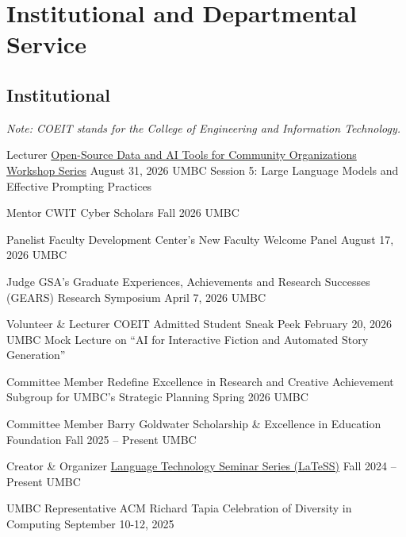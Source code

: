 \section*{{} Institutional and Departmental Service}
\subsection*{Institutional}
\textit{Note: COEIT stands for the College of Engineering and Information Technology.}

\begin{cventries}

   
\cventry
    {Lecturer}
    {\href{https://socialscience.umbc.edu/community-organizations/}{Open-Source Data and AI Tools for Community Organizations Workshop Series}}
    {August 31, 2026}
    {UMBC}
    {Session 5:  Large Language Models and Effective Prompting Practices}
    
\cventry
{Mentor}
{CWIT Cyber Scholars}
{Fall 2026}
{UMBC}
{}

\cventry
    {Panelist}
    {Faculty Development Center's New Faculty Welcome Panel}
    {August 17, 2026}
    {UMBC}
    {}

\cventry
    {Judge}
    {GSA’s Graduate Experiences, Achievements and Research Successes (GEARS) Research Symposium}
    {April 7, 2026}
    {UMBC}
    {}
    
\cventry
    {Volunteer \& Lecturer}
    {COEIT Admitted Student Sneak Peek}
    {February 20, 2026}
    {UMBC}
    {Mock Lecture on ``AI for Interactive Fiction and Automated Story Generation''}

\cventry
    {Committee Member}
    {Redefine Excellence in Research and Creative Achievement Subgroup for UMBC's Strategic Planning}
    {Spring 2026}%
    {UMBC}
    {}
    
\cventry
    {Committee Member}
    {Barry Goldwater Scholarship \& Excellence in Education Foundation}
    {Fall 2025 -- Present}
    {UMBC}
    {}

\cventry
    {Creator \& Organizer}
    {\href{https://laramartin.net/LaTeSS.html}{Language Technology Seminar Series (LaTeSS)}}
    {Fall 2024 -- Present}
    {UMBC}
    {}
    
\cventry
    {UMBC Representative}
    {ACM Richard Tapia Celebration of Diversity in Computing}
    {September 10-12, 2025}
    {}
    {}
    

\end{cventries}
